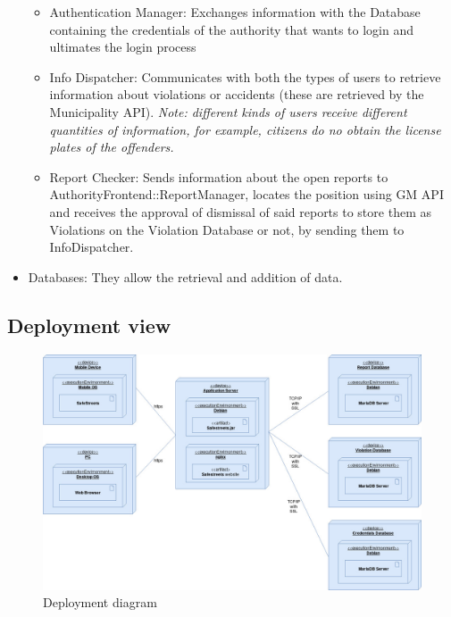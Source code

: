 \begin{itemize}
\begin{itemize}
            \item Authentication Manager: Exchanges information with the Database containing the credentials of the authority that wants to login
                and ultimates the login process
            
            \item Info Dispatcher: Communicates with both the types of users to retrieve information about violations or accidents (these are 
                retrieved by the Municipality API). \textit{Note: different kinds of users receive different quantities of information, for example, 
                citizens do no obtain the license plates of the offenders.}

            \item Report Checker: Sends information about the open reports to AuthorityFrontend::ReportManager, 
                locates the position using GM API and receives the approval of dismissal of said reports to store them as 
                Violations on the Violation Database or not, by sending them to InfoDispatcher.

        \end{itemize}
        
        \item Databases: They allow the retrieval and addition of data.
        
    \end{itemize}

\newpage



\subsection{Deployment view}

    \begin{figure}[H]

        \includegraphics[width=\textwidth]{Images/deployment.jpg}
        \caption{\label{fig:deployment}Deployment diagram}
        
    \end{figure}
	
